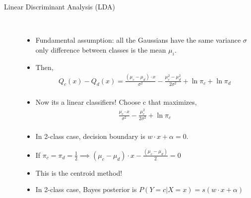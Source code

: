 \documentclass[10pt]{article}
\begin{document}
\begin{description}
	\item[Linear Discriminant Analysis (LDA)]
		\
		\begin{itemize}
			\item Fundamental assumption: all the Gaussians have the same variance $\sigma$ only difference between classes is the mean $\mu_{i}$.
			\item Then,
				\begin{align*}
					Q_{c}(x) - Q_{d}(x) = \frac{(\mu_{c}-\mu_{d})\cdot x}{\sigma^{2}} - \frac{\mu_{c}^{2}-\mu_{d}^{2}}{2\sigma^{2}} + \ln \pi_{c} + \ln \pi_{d}\\
				\end{align*}
			\item Now its a linear classifiers! Choose c that maximizes,
				\begin{align*}
					\frac{\mu_{c}\cdot x}{\sigma^{2}} - \frac{\mu_{c}^{2}}{2\sigma^{2}} + \ln \pi_{c}\\
				\end{align*}
			\item In 2-class case, decision boundary is $w \cdot x + \alpha = 0$.
			\item If $\pi_{c} = \pi_{d} = \frac{1}{2} \implies (\mu_{c} - \mu_{d})\cdot x - \frac{(\mu_{c}-\mu_{d})}{2} = 0$
			\item This is the centroid method!
			\item In 2-class case, Bayes posterior is $P(Y=c|X=x) = s(w\cdot x + \alpha)$
		\end{itemize}
	

\end{description}
\end{document}
